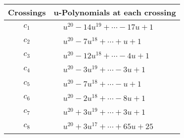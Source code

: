 \documentclass[1p]{elsarticle_modified}
\theoremstyle{definition}
\begin{document}
\begin{tabular}{m{50pt}|m{274pt}}
Crossings & \hspace{64pt}u-Polynomials at each crossing \\
\hline $$\begin{aligned}c_{1}\end{aligned}$$&$\begin{aligned}
&u^{20}-14 u^{19}+\cdots-17 u+1
\end{aligned}$\\
\hline $$\begin{aligned}c_{2}\end{aligned}$$&$\begin{aligned}
&u^{20}-7 u^{18}+\cdots+u+1
\end{aligned}$\\
\hline $$\begin{aligned}c_{3}\end{aligned}$$&$\begin{aligned}
&u^{20}-12 u^{18}+\cdots-4 u+1
\end{aligned}$\\
\hline $$\begin{aligned}c_{4}\end{aligned}$$&$\begin{aligned}
&u^{20}-3 u^{19}+\cdots-3 u+1
\end{aligned}$\\
\hline $$\begin{aligned}c_{5}\end{aligned}$$&$\begin{aligned}
&u^{20}-7 u^{18}+\cdots- u+1
\end{aligned}$\\
\hline $$\begin{aligned}c_{6}\end{aligned}$$&$\begin{aligned}
&u^{20}-2 u^{18}+\cdots-8 u+1
\end{aligned}$\\
\hline $$\begin{aligned}c_{7}\end{aligned}$$&$\begin{aligned}
&u^{20}+3 u^{19}+\cdots+3 u+1
\end{aligned}$\\
\hline $$\begin{aligned}c_{8}\end{aligned}$$&$\begin{aligned}
&u^{20}+3 u^{17}+\cdots+65 u+25
\end{aligned}$\\

\end{tabular}
\end{document}
